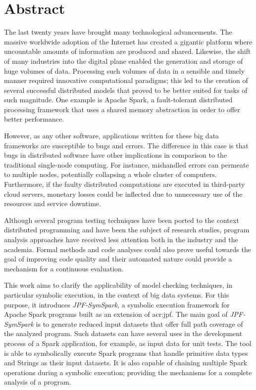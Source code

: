 \section*{Abstract}

The last twenty years have brought many technological advancements. The massive worldwide adoption of the Internet has created a gigantic platform where uncountable amounts of information are produced and shared. Likewise, the shift of many industries into the digital plane enabled the generation and storage of huge volumes of data. Processing such volumes of data in a sensible and timely manner required innovative computational paradigms; this led to the creation of several successful distributed models that proved to be better suited for tasks of such magnitude. One example is Apache Spark, a fault-tolerant distributed processing framework that uses a shared memory abstraction in order to offer better performance.

However, as any other software, applications written for these big data frameworks are susceptible to bugs and errors. The difference in this case is that bugs in distributed software have other implications in comparison to the traditional single-node computing. For instance, mishandled errors can permeate to multiple nodes, potentially collapsing a whole cluster of computers. Furthermore, if the faulty distributed computations are executed in third-party cloud servers, monetary losses could be inflected due to unnecessary use of the resources and service downtime.

Although several program testing techniques have been ported to the context distributed programming and have been the subject of research studies, program analysis approaches have received less attention both in the industry and the academia. Formal methods and code analyses could also prove useful towards the goal of improving code quality and their automated nature could provide a mechanism for a continuous evaluation.

This work aims to clarify the applicability of model checking techniques, in particular symbolic execution, in the context of big data systems. For this purpose, it introduces \textit{JPF-SymSpark}, a symbolic execution framework for Apache Spark programs built as an extension of \acrlong{acr:jpf}. The main goal of \textit{JPF-SymSpark} is to generate reduced input datasets that offer full path coverage of the analyzed program. Such datasets can have several uses in the development process of a Spark application, for example, as input data for unit tests. The tool is able to symbolically execute Spark programs that handle primitive data types and Strings as their input datasets. It is also capable of chaining multiple Spark operations during a symbolic execution; providing the mechanisms for a complete analysis of a program.

